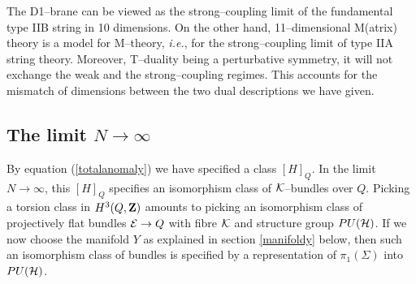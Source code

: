 \documentclass[a4paper,a4paper]{article}
\begin{document}
The D1--brane can be viewed as the strong--coupling limit 
of the fundamental type IIB string in 10 dimensions. On the other hand, 
11--dimensional M(atrix) theory is a model for M--theory, {\it i.e.}, 
for the strong--coupling limit of type IIA string theory. Moreover, 
T--duality being a perturbative symmetry, it will not exchange the weak 
and the strong--coupling regimes. This accounts for the mismatch 
of dimensions between the two dual descriptions we have given.  
  
\subsection{The limit $N\rightarrow\infty$}\label{limit}  

By equation (\ref{totalanomaly}) we have specified a class $[H]_Q$. 
In the limit $N\rightarrow\infty$, this $[H]_Q$ specifies 
an isomorphism class of ${\cal K}$--bundles over $Q$. 
Picking a torsion class in $H^3(Q, {\bf Z})$ amounts to picking an 
isomorphism class of projectively flat bundles ${\cal E}\rightarrow Q$
with fibre ${\cal K}$ and structure group $PU({\cal H})$. If we now choose 
the manifold $Y$ as explained in section \ref{manifoldy} below, 
then such an isomorphism class of bundles is specified by a representation 
of $\pi_1(\Sigma)$ into $PU({\cal H})$.
\end{document}

